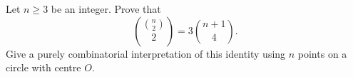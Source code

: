 Let $n \geq 3$ be an integer. Prove that
\[
\binom{\binom{n}{2}}{2} = 3\binom{n+1}{4}.
\]
Give a purely combinatorial interpretation of this identity using $n$ points on a circle with centre $O$.
